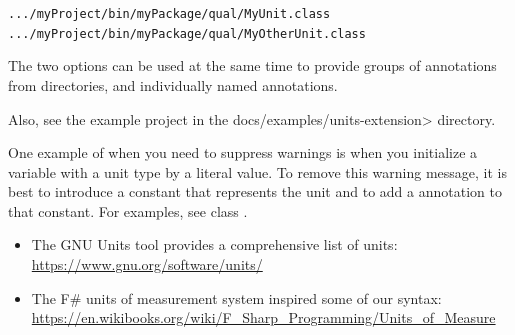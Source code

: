 \begin{itemize}
\begin{alltt}
  .../myProject/bin/myPackage/qual/MyUnit.class
  .../myProject/bin/myPackage/qual/MyOtherUnit.class
\end{alltt}

The two options can be used at the same time to provide groups of annotations
from directories, and individually named annotations.

\end{itemize}

Also, see the example project in the \<docs/examples/units-extension> directory.




One example of when you need to suppress warnings is when you
initialize a variable with a unit type by a literal value.
To remove this warning message, it is best to introduce a
constant that represents the unit and to
add a 
annotation to that constant.
For examples, see class .



\begin{itemize}
\item The GNU Units tool provides a comprehensive list of units:\\
  \url{https://www.gnu.org/software/units/}

\item The F\# units of measurement system inspired some of our syntax:\\
  \url{https://en.wikibooks.org/wiki/F_Sharp_Programming/Units_of_Measure}

\end{itemize}

